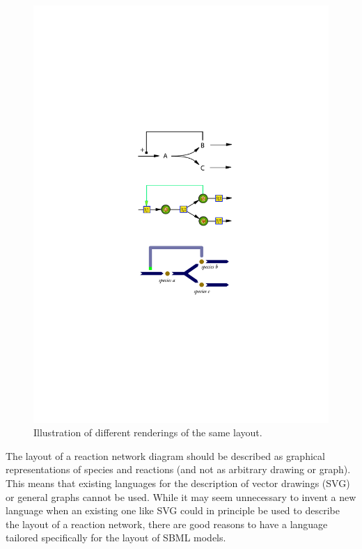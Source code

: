 \begin{center}
\begin{figure}[!h]
\begin{center}
\includegraphics[scale=1]{figures/layout1}
\end{center}
\caption{Illustration of different renderings of the same layout.}
\label{UML:All}
\label{figure:rendering}
\end{figure}
\end{center}

The layout of a reaction network diagram should be described as 
graphical representations of species and reactions (and not as arbitrary 
drawing or graph). This means that existing languages for the 
description of vector drawings (SVG) or general graphs cannot be used. 
While it may seem unnecessary to invent a new language when an existing 
one like SVG could in principle be used to describe the layout of a 
reaction network, there are good reasons to have a language tailored 
specifically for the layout of SBML models. 

